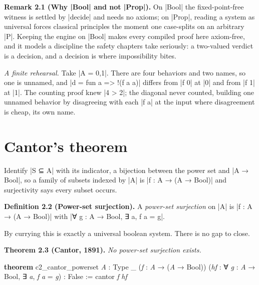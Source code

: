 \documentclass{memoir}
\begin{document}
\textbf{Remark 2.1 (Why \LeanVerb|Bool| and not \LeanVerb|Prop|).} On \LeanVerb|Bool| the fixed-point-free witness is
settled by \LeanVerb|decide| and needs no axioms; on \LeanVerb|Prop|, reading a system as
universal forces classical principles the moment one case-splits on an arbitrary
\LeanVerb|P|. Keeping the engine on \LeanVerb|Bool| makes every compiled proof here axiom-free,
and it models a discipline the safety chapters take seriously: a two-valued
verdict is a decision, and a decision is where impossibility bites.

\emph{A finite rehearsal.} Take \LeanVerb|A = 0,1|. There are four behaviors and two names,
so one is unnamed, and \LeanVerb|d = fun a => !(f a a)| differs from \LeanVerb|f 0| at \LeanVerb|0| and
from \LeanVerb|f 1| at \LeanVerb|1|. The counting proof knew \LeanVerb|4 > 2|; the diagonal never counted,
building one unnamed behavior by disagreeing with each \LeanVerb|f a| at the input where
disagreement is cheap, its own name.



\section{Cantor's theorem}\label{Two--Schemas--of--Impossibility-005F-005F-005F--Machine--Checked--Limits--of--Trustworthy--Machine--Learning-005F-005F-005F--and--Why--They--Tighten--with--Capability----The--Classical--Limits----Cantor-005F-005F-005Fs--theorem}

Identify \LeanVerb|S ⊆ A| with its indicator, a bijection between the power set and \LeanVerb|A → Bool|,
so a family of subsets indexed by \LeanVerb|A| is \LeanVerb|f : A → (A → Bool)| and surjectivity
says every subset occurs.

\textbf{Definition 2.2 (Power-set surjection).} A \emph{power-set surjection} on \LeanVerb|A| is
\LeanVerb|f : A → (A → Bool)| with \LeanVerb|∀ g : A → Bool, ∃ a, f a = g|.

By currying this is exactly a universal boolean system. There is no gap to
close.

\textbf{Theorem 2.3 (Cantor, 1891).} \emph{No power-set surjection exists.}

\begin{LeanVerbatim}
\textbf{theorem} c2_cantor_powerset \textit{A} : Type _ (\textit{f} : \textit{A} → (\textit{A} → Bool))
    (\textit{hf} : ∀ \textit{g} : \textit{A} → Bool, ∃ \textit{a}, \textit{f} \textit{a} = \textit{g}) : False :=
  cantor \textit{f} \textit{hf}

\end{LeanVerbatim}
\end{document}
